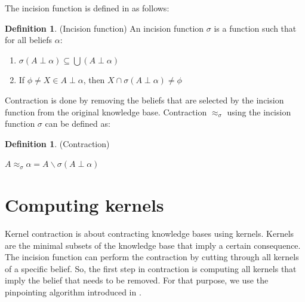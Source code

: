 \documentclass{sfuthesis}
\theoremstyle{plain}
\theoremstyle{definition}
\newtheorem{defn}[thm]{Definition}
\begin{document}
The incision function is defined in \cite{hansson} as follows:
\begin{defn}(Incision function)
An incision function $\sigma$ is a function such that for all beliefs $\alpha$:
\begin{enumerate}
\item $\sigma (A \perp \alpha) \subseteq \bigcup (A \perp \alpha)$
\item If $\phi \neq X \in A \perp \alpha$, then $X \cap \sigma (A \perp \alpha) \neq \phi$
\end{enumerate}
\end{defn}
Contraction is done by removing the beliefs that are selected by the incision function from the original knowledge base. Contraction $\approx_\sigma$ using the incision function $\sigma$ can be defined as:
\begin{defn}\cite{hansson} (Contraction)
\begin{center}
$A \approx_\sigma \alpha = A \smallsetminus \sigma (A \perp \alpha)$
\end{center}
\end{defn}


\section{Computing kernels}
Kernel contraction is about contracting knowledge bases using kernels. Kernels are the minimal subsets of the knowledge base that imply a certain consequence. The incision function can perform the contraction by cutting through all kernels of a specific belief. So, the first step in contraction is computing all kernels that imply the belief that needs to be removed. For that purpose, we use the pinpointing algorithm introduced in \cite{pin}.
\end{document}
